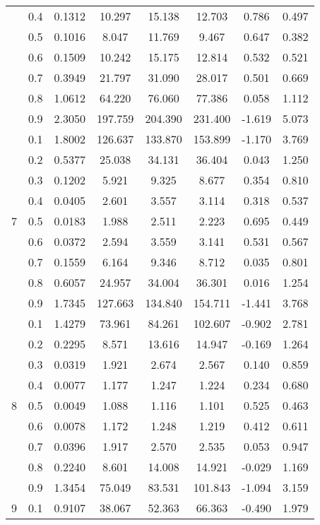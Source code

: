 \documentclass[11pt,a4paper]{report}
\begin{document}
\begin{longtable}{ | c | c || c | c | c | c | c | c | }
 & 0.4 & 0.1312 & 10.297 & 15.138 & 12.703 & 0.786 & 0.497 \\
 & 0.5 & 0.1016 & 8.047 & 11.769 & 9.467 & 0.647 & 0.382 \\
 & 0.6 & 0.1509 & 10.242 & 15.175 & 12.814 & 0.532 & 0.521 \\
 & 0.7 & 0.3949 & 21.797 & 31.090 & 28.017 & 0.501 & 0.669 \\
 & 0.8 & 1.0612 & 64.220 & 76.060 & 77.386 & 0.058 & 1.112 \\
 & 0.9 & 2.3050 & 197.759 & 204.390 & 231.400 & -1.619 & 5.073 \\
 \hline
\multirow{9}{*}{7} & 0.1 & 1.8002 & 126.637 & 133.870 & 153.899 & -1.170 & 3.769 \\
 & 0.2 & 0.5377 & 25.038 & 34.131 & 36.404 & 0.043 & 1.250 \\
 & 0.3 & 0.1202 & 5.921 & 9.325 & 8.677 & 0.354 & 0.810 \\
 & 0.4 & 0.0405 & 2.601 & 3.557 & 3.114 & 0.318 & 0.537 \\
 & 0.5 & 0.0183 & 1.988 & 2.511 & 2.223 & 0.695 & 0.449 \\
 & 0.6 & 0.0372 & 2.594 & 3.559 & 3.141 & 0.531 & 0.567 \\
 & 0.7 & 0.1559 & 6.164 & 9.346 & 8.712 & 0.035 & 0.801 \\
 & 0.8 & 0.6057 & 24.957 & 34.004 & 36.301 & 0.016 & 1.254 \\
 & 0.9 & 1.7345 & 127.663 & 134.840 & 154.711 & -1.441 & 3.768 \\
 \hline
\multirow{9}{*}{8} & 0.1 & 1.4279 & 73.961 & 84.261 & 102.607 & -0.902 & 2.781 \\
 & 0.2 & 0.2295 & 8.571 & 13.616 & 14.947 & -0.169 & 1.264 \\
 & 0.3 & 0.0319 & 1.921 & 2.674 & 2.567 & 0.140 & 0.859 \\
 & 0.4 & 0.0077 & 1.177 & 1.247 & 1.224 & 0.234 & 0.680 \\
 & 0.5 & 0.0049 & 1.088 & 1.116 & 1.101 & 0.525 & 0.463 \\
 & 0.6 & 0.0078 & 1.172 & 1.248 & 1.219 & 0.412 & 0.611 \\
 & 0.7 & 0.0396 & 1.917 & 2.570 & 2.535 & 0.053 & 0.947 \\
 & 0.8 & 0.2240 & 8.601 & 14.008 & 14.921 & -0.029 & 1.169 \\
 & 0.9 & 1.3454 & 75.049 & 83.531 & 101.843 & -1.094 & 3.159 \\
 \hline
\multirow{9}{*}{9} & 0.1 & 0.9107 & 38.067 & 52.363 & 66.363 & -0.490 & 1.979 \\

\end{longtable}
\end{document}
